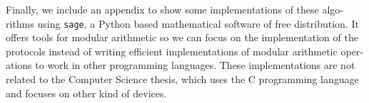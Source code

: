 \begin{otherlanguage}{english}


Finally, we include an appendix to show some implementations of these algorithms using \texttt{sage}, a Python based mathematical software of free distribution. It offers tools for modular arithmetic so we can focus on the implementation of the protocols instead of writing efficient implementations of modular arithmetic operations to work in other programming languages. These implementations are not related to the Computer Science thesis, which uses the C programming language and focuses on other kind of devices.






\end{otherlanguage}

\endgroup			

\vfill